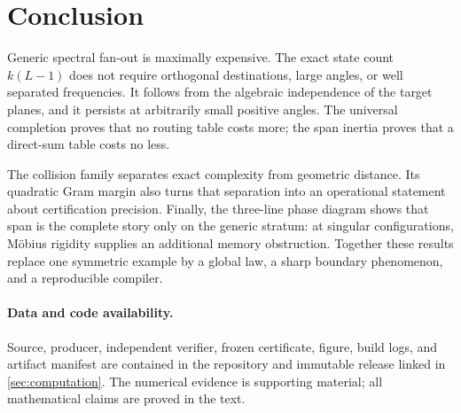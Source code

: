 \documentclass[11pt]{article}
\theoremstyle{definition}
\theoremstyle{remark}
\begin{document}
\section{Conclusion}

Generic spectral fan-out is maximally expensive.  The exact state count
$k(L-1)$ does not require orthogonal destinations, large angles, or well
separated frequencies.  It follows from the algebraic independence of the
target planes, and it persists at arbitrarily small positive angles.  The
universal completion proves that no routing table costs more; the span
inertia proves that a direct-sum table costs no less.

The collision family separates exact complexity from geometric distance.
Its quadratic Gram margin also turns that separation into an operational
statement about certification precision.  Finally, the three-line phase
diagram shows that span is the complete story only on the generic stratum:
at singular configurations, Möbius rigidity supplies an additional memory
obstruction.  Together these results replace one symmetric example by a
global law, a sharp boundary phenomenon, and a reproducible compiler.

\paragraph{Data and code availability.}
Source, producer, independent verifier, frozen certificate, figure, build
logs, and artifact manifest are contained in the repository and immutable
release linked in \cref{sec:computation}.  The numerical evidence is
supporting material; all mathematical claims are proved in the text.



\end{document}
